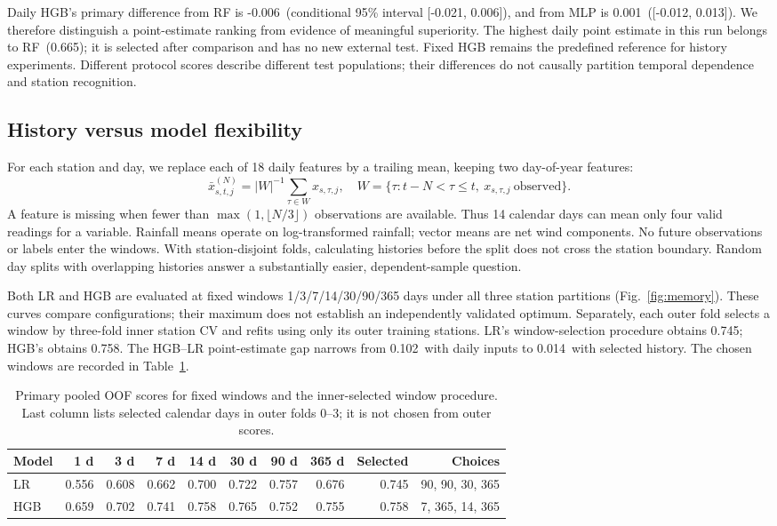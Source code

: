 \documentclass{article}
\newcommand{\SelectedWindow}{0.758}
\newcommand{\DailyModelGap}{0.102}
\newcommand{\HistoryModelGap}{0.014}
\newcommand{\SelectedWindowLR}{0.745}
\newcommand{\BestDailyName}{RF}
\newcommand{\BestDailyScore}{0.665}
\newcommand{\HgbRfDifference}{-0.006}
\newcommand{\HgbRfInterval}{[-0.021, 0.006]}
\newcommand{\HgbMlpDifference}{0.001}
\newcommand{\HgbMlpInterval}{[-0.012, 0.013]}
\begin{document}
Daily HGB's primary difference from RF is \HgbRfDifference\ (conditional 95\% interval \HgbRfInterval), and from MLP is \HgbMlpDifference\ (\HgbMlpInterval). We therefore distinguish a point-estimate ranking from evidence of meaningful superiority. The highest daily point estimate in this run belongs to \BestDailyName\ (\BestDailyScore); it is selected after comparison and has no new external test. Fixed HGB remains the predefined reference for history experiments. Different protocol scores describe different test populations; their differences do not causally partition temporal dependence and station recognition.

\subsection{History versus model flexibility}
For each station and day, we replace each of 18 daily features by a trailing mean, keeping two day-of-year features:
\[
\bar x^{(N)}_{s,t,j}=|W|^{-1}\sum_{\tau\in W}x_{s,\tau,j},\quad
W=\{\tau:t-N<\tau\le t,\ x_{s,\tau,j}\ \text{observed}\}.
\]
A feature is missing when fewer than $\max(1,\lfloor N/3\rfloor)$ observations are available. Thus 14 calendar days can mean only four valid readings for a variable. Rainfall means operate on log-transformed rainfall; vector means are net wind components. No future observations or labels enter the windows. With station-disjoint folds, calculating histories before the split does not cross the station boundary. Random day splits with overlapping histories answer a substantially easier, dependent-sample question.

Both LR and HGB are evaluated at fixed windows 1/3/7/14/30/90/365 days under all three station partitions (Fig.~\ref{fig:memory}). These curves compare configurations; their maximum does not establish an independently validated optimum. Separately, each outer fold selects a window by three-fold inner station CV and refits using only its outer training stations. LR's window-selection procedure obtains \SelectedWindowLR; HGB's obtains \SelectedWindow. The HGB--LR point-estimate gap narrows from \DailyModelGap\ with daily inputs to \HistoryModelGap\ with selected history. The chosen windows are recorded in Table~\ref{tab:windows}.

\begin{table}[htbp]
\centering\small
\setlength{\tabcolsep}{4pt}
\caption{Primary pooled OOF scores for fixed windows and the inner-selected window procedure. Last column lists selected calendar days in outer folds 0--3; it is not chosen from outer scores.}\label{tab:windows}
\begin{tabular}{lrrrrrrrrr}\toprule
Model & 1 d & 3 d & 7 d & 14 d & 30 d & 90 d & 365 d & Selected & Choices \\ \midrule
LR & 0.556 & 0.608 & 0.662 & 0.700 & 0.722 & 0.757 & 0.676 & 0.745 & 90, 90, 30, 365 \\
HGB & 0.659 & 0.702 & 0.741 & 0.758 & 0.765 & 0.752 & 0.755 & 0.758 & 7, 365, 14, 365 \\
\bottomrule\end{tabular}
\end{table}
\end{document}
